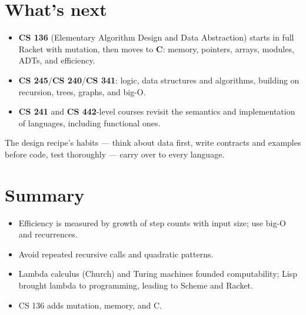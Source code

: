 \section{What's next}
\begin{itemize}
  \item \textbf{CS 136} (Elementary Algorithm Design and Data Abstraction) starts in full Racket with mutation, then moves to \textbf{C}: memory, pointers, arrays, modules, ADTs, and efficiency.
  \item \textbf{CS 245}/\textbf{CS 240}/\textbf{CS 341}: logic, data structures and algorithms, building on recursion, trees, graphs, and big-O.
  \item \textbf{CS 241} and \textbf{CS 442}-level courses revisit the semantics and implementation of languages, including functional ones.
\end{itemize}

The design recipe's habits --- think about data first, write contracts and
examples before code, test thoroughly --- carry over to every language.

\section{Summary}
\begin{itemize}
  \item Efficiency is measured by growth of step counts with input size; use big-O and recurrences.
  \item Avoid repeated recursive calls and quadratic  patterns.
  \item Lambda calculus (Church) and Turing machines founded computability; Lisp brought lambda to programming, leading to Scheme and Racket.
  \item CS 136 adds mutation, memory, and C.
\end{itemize}

